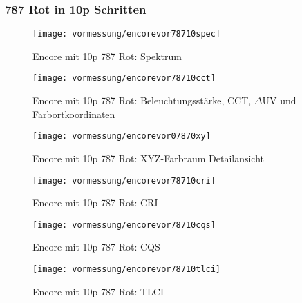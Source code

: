 \documentclass[pagesize,paper=A4,fontsize=12pt,utf8,numbers=noenddot,bibliography=totoc,listof=totoc,DIV=11,BCOR=1mm]{scrreprt}
\begin{document}
\subsubsection{787 Rot in 10p Schritten}

\begin{figure}[htp]     %
\centering
\texttt{[image: vormessung/encorevor78710spec]} 
\caption {Encore mit 10p 787 Rot: Spektrum} 
\end{figure}

\begin{figure}[htp]     %
\centering
\texttt{[image: vormessung/encorevor78710cct]} 
\caption {Encore mit 10p 787 Rot: Beleuchtungsstärke, CCT, $\Delta$UV und Farbortkoordinaten} 
\end{figure}

\begin{figure}[htp]     %
\centering
\texttt{[image: vormessung/encorevor07870xy]} 
\caption {Encore mit 10p 787 Rot: XYZ-Farbraum Detailansicht} 
\end{figure}

\begin{figure}[htp]     %
\centering
\texttt{[image: vormessung/encorevor78710cri]} 
\caption {Encore mit 10p 787 Rot: CRI} 
\end{figure}

\begin{figure}[htp]     %
\centering
\texttt{[image: vormessung/encorevor78710cqs]} 
\caption {Encore mit 10p 787 Rot: CQS} 
\end{figure}

\begin{figure}[htp]     %
\centering
\texttt{[image: vormessung/encorevor78710tlci]} 
\caption {Encore mit 10p 787 Rot: TLCI} 
\end{figure}
\end{document}

